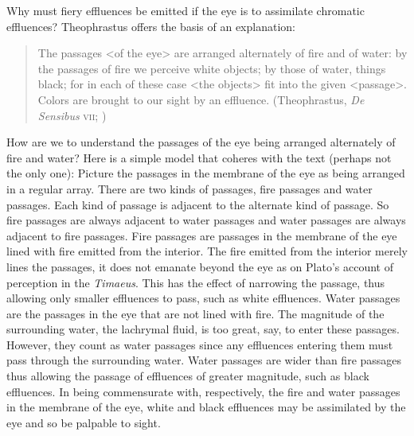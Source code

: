 Why must fiery effluences be emitted if the eye is to assimilate chromatic effluences? Theophrastus offers the basis of an explanation:
\begin{quote}
	The passages <of the eye> are arranged alternately of fire and of water: by the passages of fire we perceive white objects; by those of water, things black; for in each of these case <the objects> fit into the given <passage>. Colors are brought to our sight by an effluence. (Theophrastus, \emph{De Sensibus} \textsc{vii}; \citealt[71--73]{Stratton:1917vn})
\end{quote}
How are we to understand the passages of the eye being arranged alternately of fire and water? Here is a simple model that coheres with the text (perhaps not the only one): Picture the passages in the membrane of the eye as being arranged in a regular array. There are two kinds of passages, fire passages and water passages. Each kind of passage is adjacent to the alternate kind of passage. So fire passages are always adjacent to water passages and water passages are always adjacent to fire passages. Fire passages are passages in the membrane of the eye lined with fire emitted from the interior. The fire emitted from the interior merely lines the passages, it does not emanate beyond the eye as on Plato's account of perception in the \emph{Timaeus}. This has the effect of narrowing the passage, thus allowing only smaller effluences to pass, such as white effluences. Water passages are the passages in the eye that are not lined with fire. The magnitude of the surrounding water, the lachrymal fluid, is too great, say, to enter these passages. However, they count as water passages since any effluences entering them must pass through the surrounding water. Water passages are wider than fire passages thus allowing the passage of effluences of greater magnitude, such as black effluences. In being commensurate with, respectively, the fire and water passages in the membrane of the eye, white and black effluences may be assimilated by the eye and so be palpable to sight. 


